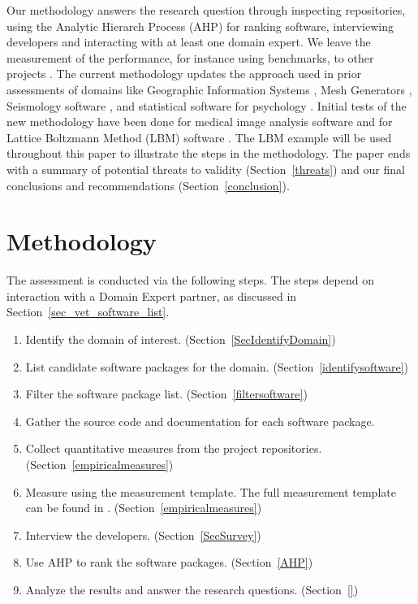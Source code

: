 \documentclass[runningheads]{llncs}
\begin{document}
Our methodology answers the research question through inspecting repositories,
using the Analytic Hierarch Process (AHP) for ranking software, interviewing
developers and interacting with at least one domain expert.  We leave the
measurement of the performance, for instance using benchmarks, to other projects
\cite{kaagstrom1998gemm}. The current methodology updates the approach used in
prior assessments of domains like Geographic Information Systems
\cite{SmithEtAl2018_arXivGIS}, Mesh Generators \cite{SmithEtAl2016}, Seismology
software \cite{SmithEtAl2018}, and statistical software for psychology
\cite{SmithEtAl2018_StatSoft}.  Initial tests of the new methodology have been
done for medical image analysis software \cite{Dong2021} and for Lattice
Boltzmann Method (LBM) software \cite{Michalski2021}.  The LBM example will be
used throughout this paper to illustrate the steps in the methodology.  The
paper ends with a summary of potential threats to validity
(Section~\ref{threats}) and our final conclusions and recommendations
(Section~\ref{conclusion}).

\section{Methodology} \label{StepsAQDS}

The assessment is conducted via the following steps.  The steps depend on
interaction with a Domain Expert partner, as discussed in
Section~\ref{sec_vet_software_list}.

\begin{enumerate}
  \item Identify the domain of interest. (Section~\ref{SecIdentifyDomain})
	\item List candidate software packages for the domain.
	(Section~\ref{identifysoftware})
	\item Filter the software package list. (Section~\ref{filtersoftware})
	\item Gather the source code and documentation for each software package.
	\item Collect quantitative measures from the project repositories.
	(Section~\ref{empiricalmeasures})
	\item Measure using the measurement template.  The full measurement template
	can be found in \cite{SmithEtAl2021}. (Section~\ref{empiricalmeasures})
	\item Interview the developers. (Section~\ref{SecSurvey})
	\item Use AHP to rank the software packages. (Section~\ref{AHP})
	\item Analyze the results and answer the research questions. (Section~\ref{})
\end{enumerate}
\end{document}
